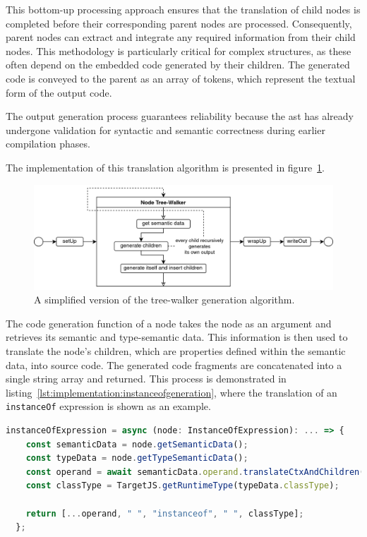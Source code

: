 This bottom-up processing approach ensures that the translation of child nodes is completed before their corresponding parent nodes are processed. Consequently, parent nodes can extract and integrate any required information from their child nodes. This methodology is particularly critical for complex structures, as these often depend on the embedded code generated by their children. The generated code is conveyed to the parent as an array of tokens, which represent the textual form of the output code.

The output generation process guarantees reliability because the \acrshort{ast} has already undergone validation for syntactic and semantic correctness during earlier compilation phases.

The implementation of this translation algorithm is presented in figure~\ref{fig:implementation:translationalgorithm}.

\begin{figure}[h!]
	\centering
	\includegraphics[scale=0.9]{./pics/Output-Generation.drawio}
	\caption{A simplified version of the tree-walker generation algorithm.}
	\label{fig:implementation:translationalgorithm}
\end{figure}

The code generation function of a node takes the node as an argument and retrieves its semantic and type-semantic data. This information is then used to translate the node's children, which are properties defined within the semantic data, into source code. The generated code fragments are concatenated into a single string array and returned. This process is demonstrated in listing~\ref{lst:implementation:instanceofgeneration}, where the translation of an \lstinline|instanceOf| expression is shown as an example.

\begin{lstlisting}[language=TypeScript,caption=The code generation function of a \lstinline|instanceOf| expression,label=lst:implementation:instanceofgeneration]
instanceOfExpression = async (node: InstanceOfExpression): ... => {
	const semanticData = node.getSemanticData();
	const typeData = node.getTypeSemanticData();
	const operand = await semanticData.operand.translateCtxAndChildren();
	const classType = TargetJS.getRuntimeType(typeData.classType);

    return [...operand, " ", "instanceof", " ", classType];
  };
\end{lstlisting}

